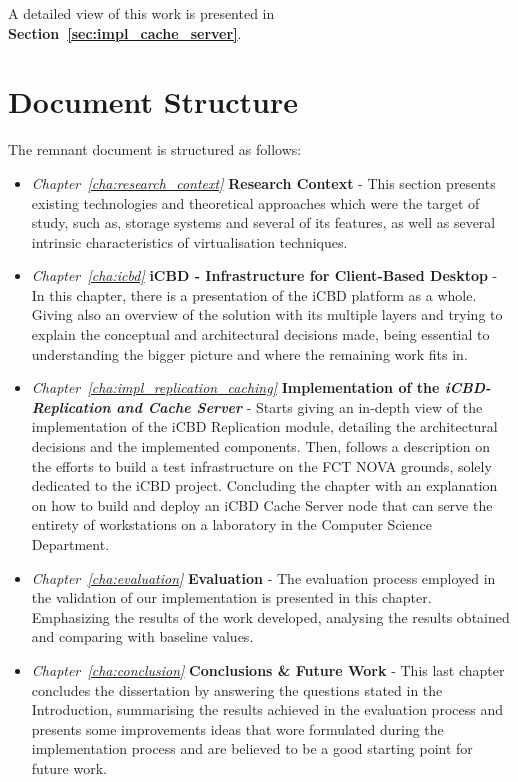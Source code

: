 A detailed view of this work is presented in \textbf{Section~\ref{sec:impl_cache_server}}.



\section{Document Structure} %
\label{sec:intro_document_structure}

The remnant document is structured as follows: 

\begin{itemize}

  \item \textit{Chapter~\ref{cha:research_context}}  \textbf{Research Context} - This section presents existing technologies and theoretical approaches which were the target of study, such as, storage systems and several of its features, as well as several intrinsic characteristics of virtualisation techniques.
  \item \textit{Chapter~\ref{cha:icbd}} \textbf{iCBD - Infrastructure for Client-Based Desktop} - In this chapter, there is a presentation of the iCBD platform as a whole. Giving also an overview of the solution with its multiple layers and trying to explain the conceptual and architectural decisions made, being essential to understanding the bigger picture and where the remaining work fits in.
  \item \textit{Chapter~\ref{cha:impl_replication_caching}} \textbf{Implementation of the \textit{iCBD-Replication and Cache Server}} - Starts giving an in-depth view of the implementation of the iCBD Replication module, detailing the architectural decisions and the implemented components. Then, follows a description on the efforts to build a test infrastructure on the FCT NOVA grounds, solely dedicated to the iCBD project. Concluding the chapter with an explanation on how to build and deploy an iCBD Cache Server node that can serve the entirety of workstations on a laboratory in the Computer Science Department.
  \item \textit{Chapter~\ref{cha:evaluation}} \textbf{Evaluation} - The evaluation process employed in the validation of our implementation is presented in this chapter. Emphasizing the results of the work developed, analysing the results obtained and comparing with baseline values.
  \item \textit{Chapter~\ref{cha:conclusion}} \textbf{Conclusions \& Future Work} - This last chapter concludes the dissertation by answering the questions stated in the Introduction, summarising the results achieved in the evaluation process and presents some improvements ideas that wore formulated during the implementation process and are believed to be a good starting point for future work.
\end{itemize}

